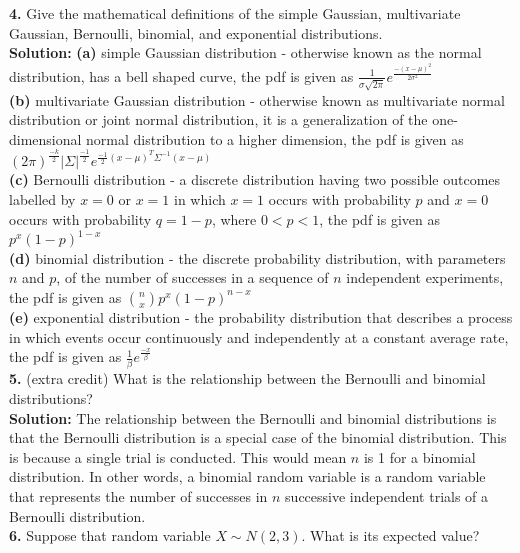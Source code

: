 \documentclass[a4paper]{article}
\begin{document}
\textbf{4.} Give the mathematical definitions of the simple Gaussian, multivariate 
Gaussian, Bernoulli, binomial, and exponential distributions.\\

\textbf{Solution:} \textbf{(a)} simple Gaussian distribution - otherwise known as the normal 
distribution, has a bell shaped curve, the pdf is given as $\frac{1}{\sigma \sqrt{2 
\pi}}e^{\frac{-(x-\mu)^2}{2\sigma^2}}$\\

\textbf{(b)} multivariate Gaussian distribution - otherwise known as multivariate normal 
distribution or joint normal distribution, it is a generalization of the one-dimensional 
normal distribution to a higher dimension, the pdf is given as $(2 \pi)^{\frac{-k}{2}}|\Sigma|
^{\frac{-1}{2}}e^{\frac{-1}{2}(x-\mu)^T \Sigma^{-1}(x-\mu)}$\\

\textbf{(c)} Bernoulli distribution - a discrete distribution having two possible outcomes labelled by 
$x=0$ or $x=1$ in which $x=1$ occurs with probability $p$ and $x=0$ occurs with probability 
$q=1-p$, where $0<p<1$, the pdf is given as $p^x(1-p)^{1-x}$\\

\textbf{(d)} binomial distribution - the discrete probability distribution, with parameters $n$ and $p$, 
of the number of successes in a sequence of $n$ independent experiments, the pdf is given as 
${n \choose x} p^x (1-p)^{n-x}$\\

\textbf{(e)} exponential distribution - the probability distribution that describes a process in which 
events occur continuously and independently at a constant average rate, the pdf is given as 
$\frac{1}{\beta}e^{\frac{-x}{\beta}}$\\
\textbf{5.} (extra credit) What is the relationship between the Bernoulli and binomial 
distributions?\\

\textbf{Solution:} The relationship between the Bernoulli and binomial distributions is that 
the Bernoulli distribution is a special case of the binomial distribution.  This is because a 
single trial is conducted.  This would mean $n$ is 1 for a binomial distribution.  In other words, 
a binomial random variable is a random variable that represents the number of successes in $n$ 
successive independent trials of a Bernoulli distribution.\\
\textbf{6.} Suppose that random variable $X \sim N(2, 3)$.  What is its expected value?\\
\end{document}
